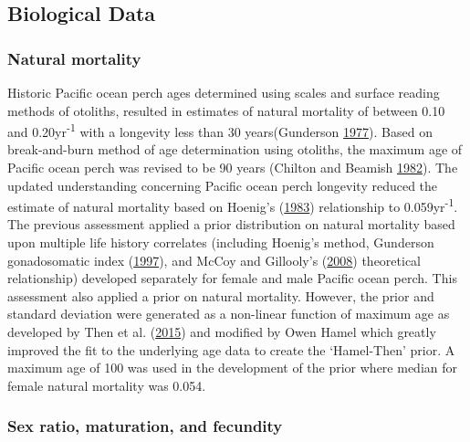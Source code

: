 \documentclass[12pt,]{article}
\begin{document}
\subsection{Biological Data}\label{biological-data}

\subsubsection{Natural mortality}\label{natural-mortality}

Historic Pacific ocean perch ages determined using scales and surface
reading methods of otoliths, resulted in estimates of natural mortality
of between 0.10 and 0.20yr\textsuperscript{-1} with a longevity less
than 30 years(Gunderson
\protect\hyperlink{ref-gunderson_population_1977}{1977}). Based on
break-and-burn method of age determination using otoliths, the maximum
age of Pacific ocean perch was revised to be 90 years (Chilton and
Beamish \protect\hyperlink{ref-chilton_age_1982}{1982}). The updated
understanding concerning Pacific ocean perch longevity reduced the
estimate of natural mortality based on Hoenig's
(\protect\hyperlink{ref-hoenig_empirical_1983}{1983}) relationship to
0.059yr\textsuperscript{-1}. The previous assessment applied a prior
distribution on natural mortality based upon multiple life history
correlates (including Hoenig's method, Gunderson gonadosomatic index
(\protect\hyperlink{ref-gunderson_trade-off_1997}{1997}), and McCoy and
Gillooly's (\protect\hyperlink{ref-mccoy_predicting_2008}{2008})
theoretical relationship) developed separately for female and male
Pacific ocean perch. This assessment also applied a prior on natural
mortality. However, the prior and standard deviation were generated as a
non-linear function of maximum age as developed by Then et al.
(\protect\hyperlink{ref-then_evaluating_2015}{2015}) and modified by
Owen Hamel which greatly improved the fit to the underlying age data to
create the `Hamel-Then' prior. A maximum age of 100 was used in the
development of the prior where median for female natural mortality was
0.054.

\subsubsection{Sex ratio, maturation, and
fecundity}\label{sex-ratio-maturation-and-fecundity}
\end{document}
